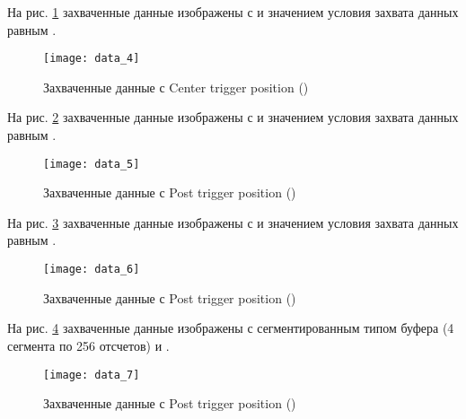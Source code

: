 На рис. \ref{fig:data_4} захваченные данные изображены с  и значением условия захвата данных равным .

\vspace{-0.5cm}
\begin{figure}[H]
	\begin{center}
		\texttt{[image: data\_4]}
		\caption{Захваченные данные с Center trigger position ()}
		\label{fig:data_4}
	\end{center}
\end{figure}

На рис. \ref{fig:data_5} захваченные данные изображены с  и значением условия захвата данных равным .

\vspace{-0.5cm}
\begin{figure}[H]
	\begin{center}
		\texttt{[image: data\_5]}
		\caption{Захваченные данные с Post trigger position ()}
		\label{fig:data_5}
	\end{center}
\end{figure}

На рис. \ref{fig:data_6} захваченные данные изображены с  и значением условия захвата данных равным .

\vspace{-0.5cm}
\begin{figure}[H]
	\begin{center}
		\texttt{[image: data\_6]}
		\caption{Захваченные данные с Post trigger position ()}
		\label{fig:data_6}
	\end{center}
\end{figure}

На рис. \ref{fig:data_7} захваченные данные изображены с сегментированным типом буфера (4 сегмента по 256 отсчетов) и .

\vspace{-0.5cm}
\begin{figure}[H]
	\begin{center}
		\texttt{[image: data\_7]}
		\caption{Захваченные данные с Post trigger position ()}
		\label{fig:data_7}
	\end{center}
\end{figure}

